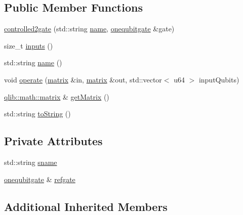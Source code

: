 \subsection*{Public Member Functions}
\begin{DoxyCompactItemize}
\item 
\hyperlink{classqlib_1_1quantum_1_1gates_1_1controlled2gate_a83775bed048e4856d99c8d59d6a20db3}{controlled2gate} (std\+::string \hyperlink{classqlib_1_1quantum_1_1gates_1_1controlled2gate_a25121d9bc52a594a718b6d8037ea6cc0}{name}, \hyperlink{classqlib_1_1quantum_1_1gates_1_1onequbitgate}{onequbitgate} \&gate)
\item 
size\+\_\+t \hyperlink{classqlib_1_1quantum_1_1gates_1_1controlled2gate_a27a8793a3015aa9797f03fa0174113c2}{inputs} ()
\item 
std\+::string \hyperlink{classqlib_1_1quantum_1_1gates_1_1controlled2gate_a25121d9bc52a594a718b6d8037ea6cc0}{name} ()
\item 
void \hyperlink{classqlib_1_1quantum_1_1gates_1_1controlled2gate_a272635da6a7b8f65379f6ecb42df9389}{operate} (\hyperlink{classqlib_1_1math_1_1matrix}{matrix} \&in, \hyperlink{classqlib_1_1math_1_1matrix}{matrix} \&out, std\+::vector$<$ u64 $>$ input\+Qubits)
\item 
\hyperlink{classqlib_1_1math_1_1matrix}{qlib\+::math\+::matrix} \& \hyperlink{classqlib_1_1quantum_1_1gates_1_1controlled2gate_aeefab300e88034edbb5eacfa882ed218}{get\+Matrix} ()
\item 
std\+::string \hyperlink{classqlib_1_1quantum_1_1gates_1_1controlled2gate_a4fda814b0336d103f5cdb7ea98507bd1}{to\+String} ()
\end{DoxyCompactItemize}
\subsection*{Private Attributes}
\begin{DoxyCompactItemize}
\item 
std\+::string \hyperlink{classqlib_1_1quantum_1_1gates_1_1controlled2gate_a32ec87dafda9c4c80af4dc93758f6275}{sname}
\item 
\hyperlink{classqlib_1_1quantum_1_1gates_1_1onequbitgate}{onequbitgate} \& \hyperlink{classqlib_1_1quantum_1_1gates_1_1controlled2gate_abb21342d2206fbc4f7ab4e781997e471}{refgate}
\end{DoxyCompactItemize}
\subsection*{Additional Inherited Members}


